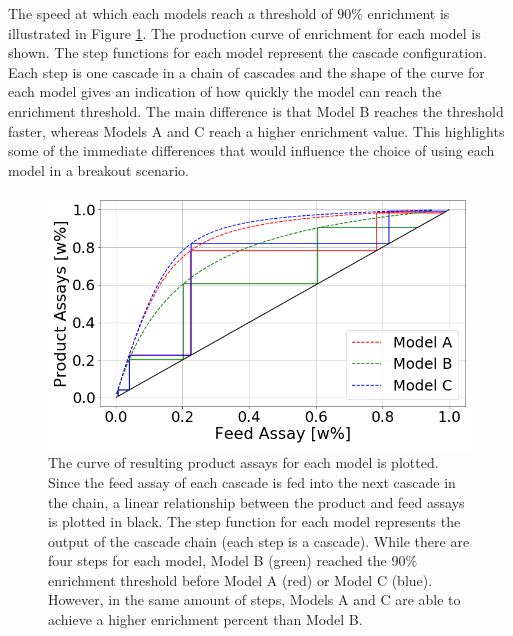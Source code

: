 The speed at which each models reach a threshold of $90\%$ enrichment is
illustrated in Figure \ref{fig:model_comparison}. The production curve of
enrichment for each model is shown. The step functions for each model represent
the cascade configuration. Each step is one cascade in a chain of cascades and
the shape of the curve for each model gives an indication of how quickly the model
can reach the enrichment threshold. The main difference is that Model B reaches
the threshold faster, whereas Models A and C reach a higher enrichment value.
This highlights some of the immediate differences that would influence the choice
of using each model in a breakout scenario.

\begin{figure}[ht]
    \centering
    \includegraphics[scale=0.4]{ModelComparison}
    \caption{The curve of resulting product assays for each model is plotted.
    Since the feed assay of each cascade is fed into the next cascade in the
    chain, a linear relationship between the product and feed assays is plotted
    in black. The step function for each model represents the output of the
    cascade chain (each step is a cascade). While there are four steps for each
    model, Model B (green) reached the $90\%$ enrichment threshold before
    Model A (red) or Model C (blue). However, in the same amount of steps, Models
    A and C are able to achieve a higher enrichment percent than Model B.}
    \label{fig:model_comparison}
\end{figure}
